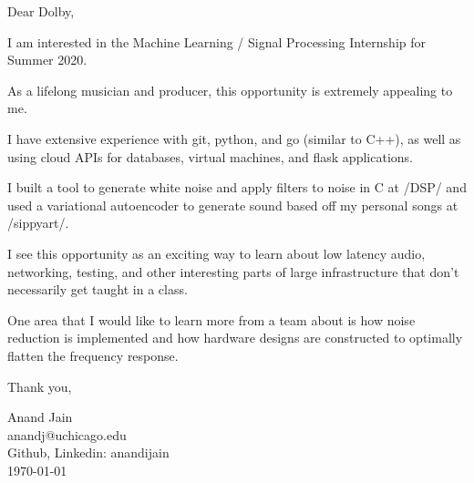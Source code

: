 \documentclass[11pt,a4paper,english]{letter} %
\begin{document}
Dear Dolby,

I am interested in the Machine Learning / Signal Processing Internship for Summer 2020.

As a lifelong musician and producer, this opportunity is extremely appealing to me.

I have extensive experience with git, python, and go (similar to C++), as well as using cloud APIs for databases, virtual machines, and flask applications.

I built a tool to generate white noise and apply filters to noise in C at /DSP/ and used a variational autoencoder to generate sound based off my personal songs at /sippyart/.

I see this opportunity as an exciting way to learn about low latency audio, networking, testing, and other interesting parts of large infrastructure that don't necessarily get taught in a class.

One area that I would like to learn more from a team about is how noise reduction is implemented and how hardware designs are constructed to optimally flatten the frequency response.

Thank you, 

Anand Jain\\
anandj@uchicago.edu\\
Github, Linkedin: anandijain\\
\today\\
\end{document}
